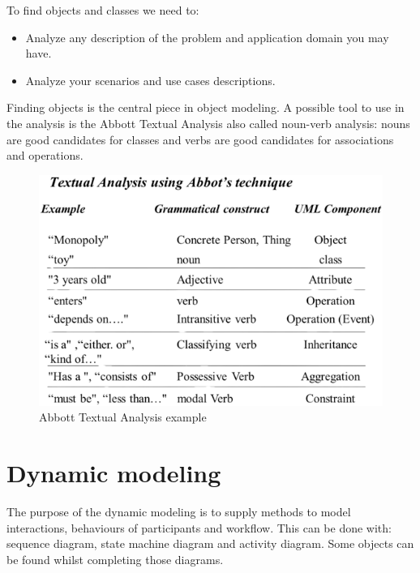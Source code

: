 \documentclass[12pt, a4paper]{report}
\newtheorem[style=M,bodystyle=\normalfont]{theorem}{Theorem}
\newtheorem[style=M,bodystyle=\normalfont]{corollary}{Corollary}
\newtheorem[style=M,bodystyle=\normalfont]{lemma}{Lemma}
\newtheorem[style=M,bodystyle=\normalfont]{definition}{Definition}
\begin{document}
    To find objects and classes we need to:
    \begin{itemize}
        \item Analyze any description of the problem and application domain you may have.
        \item Analyze your scenarios and use cases descriptions.
    \end{itemize}
    Finding objects is the central piece in object modeling. A possible tool to use in the analysis is the Abbott Textual Analysis also called noun-verb analysis: nouns are good 
    candidates for classes and verbs are good candidates for associations and operations. 
    \begin{figure}[H]
        \centering
        \includegraphics[width=0.5\linewidth]{images/Abbott.png}
        \caption{Abbott Textual Analysis example}
    \end{figure}
\section{Dynamic modeling}
    The purpose of the dynamic modeling is to supply methods to model interactions, behaviours of participants and workflow. This can be done with: sequence diagram, state machine 
    diagram and activity diagram. Some objects can be found whilst completing those diagrams.
     
\end{document}
